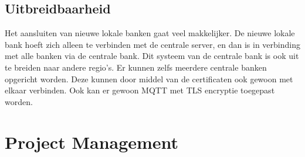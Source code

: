 \documentclass{article}
\begin{document}
\subsection{Uitbreidbaarheid}
Het aansluiten van nieuwe lokale banken gaat veel makkelijker.
De nieuwe lokale bank hoeft zich alleen te verbinden met de centrale server,
en dan is in verbinding met alle banken via de centrale bank.
Dit systeem van de centrale bank is ook uit te breiden naar andere regio's.
Er kunnen zelfs meerdere centrale banken opgericht worden.
Deze kunnen door middel van de certificaten ook gewoon met elkaar verbinden.
Ook kan er gewoon MQTT met TLS encryptie toegepast worden.

\clearpage
\newpage

\section{Project Management}
\end{document}
